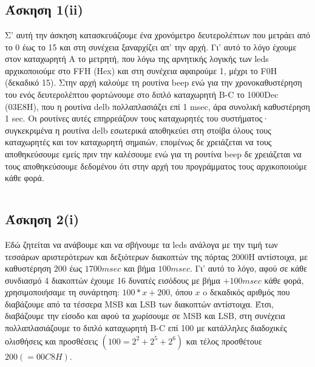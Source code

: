 \documentclass[a4paper,10pt]{article} \usepackage{anysize}
\begin{document}


\section*{} \setcounter{section}{1}
\subsection*{Άσκηση 1(ii)}\setcounter{subsection}{1}
Σ' αυτή την άσκηση κατασκευάζουμε ένα χρονόμετρο δευτερολέπτων που μετράει
από το 0 έως το 15 και στη συνέχεια ξαναρχίζει απ' την αρχή. Γι' αυτό το λόγο
έχουμε στον καταχωρητή Α το μετρητή, που λόγω της αρνητικής λογικής των leds
αρχικοποιούμε στο FFH (Hex) και στη συνέχεια αφαιρούμε 1, μέχρι το F0H
(δεκαδικό 15). Στην αρχή καλούμε τη ρουτίνα beep ενώ για την χρονοκαθυστέρηση
του ενός δευτερολέπτου φορτώνουμε στο διπλό καταχωρητή B-C το 1000Dec (03Ε8Η),
που η ρουτίνα delb πολλαπλασιάζει επί 1 msec, άρα συνολική καθυστέρηση 1 sec.
Οι ρουτίνες αυτές επηρρεάζουν τους καταχωρητές του συστήματος· συγκεκριμένα η
ρουτίνα delb εσωτερικά αποθηκεύει στη στοίβα όλους τους καταχωρητές και τον
καταχωρητή σημαιών, επομένως δε χρειάζεται να τους αποθηκεύσουμε εμείς πριν
την καλέσουμε ενώ για τη ρουτίνα beep δε χρειάζεται να τους αποθηκεύσουμε
δεδομένου ότι στην αρχή του προγράμματος τους αρχικοποιούμε κάθε φορά.
\inputminted[linenos,obeytabs,fontsize=\footnotesize]{oldasm}{../askhsh_1_ii.8085}
\subsection*{Άσκηση 2(i)}
Εδώ ζητείται να ανάβουμε και να σβήνουμε τα leds ανάλογα με την τιμή των
τεσσάρων  αριστερότερων και δεξιότερων διακοπτών της πόρτας 2000Η αντίστοιχα,
με καθυστέρηση $200$ έως $1700 msec$ και βήμα $100 msec$. Γι' αυτό το λόγο, αφού σε
κάθε συνδιασμό 4 διακοπτών έχουμε 16 δυνατές εισόδους με βήμα $+100msec$ κάθε
φορά, χρησιμοποιήσαμε τη συνάρτηση: $100 * x + 200$, όπου $x$ o δεκαδικός αριθμός
που διαβάζουμε από τα τέσσερα MSB και LSB των διακοπτών αντίστοιχα. Έτσι,
διαβάζουμε την είσοδο και αφού τα χωρίσουμε σε MSB και LSB, στη συνέχεια
πολλαπλασιάζουμε το διπλό καταχωρητή B-C επί 100 με κατάλληλες διαδοχικές
ολισθήσεις και προσθέσεις $(100= 2^2 + 2^5 + 2^6)$ και τέλος προσθέτουε $200 
(=00C8H)$.
\inputminted[linenos,obeytabs,fontsize=\footnotesize]{oldasm}{../askhsh_2_i.8085}
\end{document}
